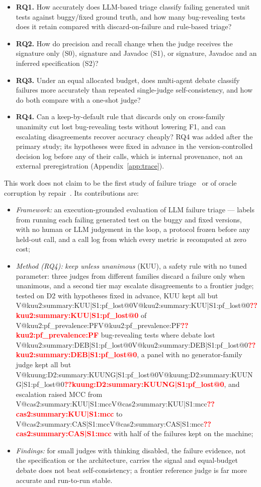 \documentclass[pdflatex,iicol,sn-mathphys-num]{sn-jnl}
\makeatletter
\newcommand{\V}[1]{\ifcsname V@#1\endcsname\csname V@#1\endcsname\else\textbf{\textcolor{red}{??#1}}\fi}
\makeatother
\begin{document}
\begin{itemize}
\item \textbf{RQ1.} How accurately does LLM-based triage classify failing generated unit tests against buggy/fixed ground truth, and how many bug-revealing tests does it retain compared with discard-on-failure and rule-based triage?
\item \textbf{RQ2.} How do precision and recall change when the judge receives the signature only (S0), signature and Javadoc (S1), or signature, Javadoc and an inferred specification (S2)?
\item \textbf{RQ3.} Under an equal allocated budget, does multi-agent debate classify failures more accurately than repeated single-judge self-consistency, and how do both compare with a one-shot judge?
\item \textbf{RQ4.} Can a keep-by-default rule that discards only on cross-family unanimity cut lost bug-revealing tests without lowering F1, and can escalating disagreements recover accuracy cheaply? RQ4 was added after the primary study; its hypotheses were fixed in advance in the version-controlled decision log before any of their calls, which is internal provenance, not an external preregistration (Appendix~\ref{app:trace}).
\end{itemize}

This work does not claim to be the first study of failure triage~\cite{liu2026jstestcraft,maddila2026agentic,fu2026javaoracle,herzig2015alarms,jiang2017alarm} or of oracle corruption by repair~\cite{mathews2026validate,zhao2026misguidance,li2026selfrepair}. Its contributions are:
\begin{itemize}
\item \emph{Framework:} an execution-grounded evaluation of LLM failure triage --- labels from running each failing generated test on the buggy and fixed versions, with no human or LLM judgement in the loop, a protocol frozen before any held-out call, and a call log from which every metric is recomputed at zero cost;
\item \emph{Method (RQ4):} \emph{keep unless unanimous} (KUU), a safety rule with no tuned parameter: three judges from different families discard a failure only when unanimous, and a second tier may escalate disagreements to a frontier judge; tested on D2 with hypotheses fixed in advance, KUU kept all but \V{kuu2:summary:KUU|S1:pf_lost@0} of \V{kuu2:pf_prevalence:PF} bug-revealing tests where debate lost \V{kuu2:summary:DEB|S1:pf_lost@0}, a panel with no generator-family judge kept all but \V{kuung:D2:summary:KUUNG|S1:pf_lost@0}, and escalation raised MCC from \V{cas2:summary:KUU|S1:mcc} to \V{cas2:summary:CAS|S1:mcc} with half of the failures kept on the machine;
\item \emph{Findings:} for small judges with thinking disabled, the failure evidence, not the specification or the architecture, carries the signal and equal-budget debate does not beat self-consistency; a frontier reference judge is far more accurate and run-to-run stable.
\end{itemize}
\end{document}
